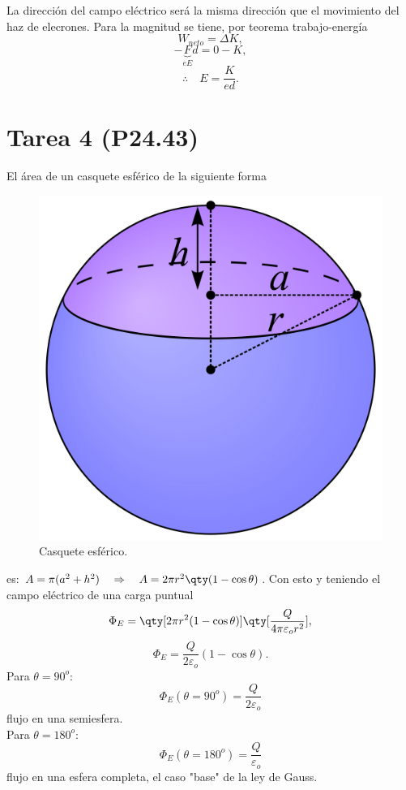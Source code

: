La dirección del campo eléctrico será la misma dirección que el movimiento del haz de elecrones. Para la magnitud se tiene, por teorema trabajo-energía
	$$ W_{neto} = \Delta K, $$
	$$ -\underbrace{F}_{eE} d = 0 - K, $$
	$$ \therefore \quad E = \frac{K}{ed}. $$











\section*{Tarea 4 (P24.43)}

El área de un casquete esférico de la siguiente forma
	\begin{figure}[H]
		\centering
		\includegraphics[scale=0.1]{./img/casquete.png}
		\caption{Casquete esférico.}
		\label{casq}
	\end{figure}
es: $ A = \pi (a^2 + h^2) \quad \Rightarrow \quad A = 2\pi r^2 \qty(1-\cos{\theta}) $. Con esto y teniendo el campo eléctrico de una carga puntual
	$$ \Phi _E = \qty[2\pi r^2 (1-\cos{\theta})]\qty[\frac{Q}{4\pi \varepsilon _o r^2}], $$
	$$ \Phi _E = \frac{Q}{2\varepsilon _o} (1 - \cos{\theta}). $$
Para $\theta = 90^o$:
	$$ \Phi _E (\theta = 90^o) = \frac{Q}{2\varepsilon _o} $$
flujo en una semiesfera. \\
Para $\theta = 180^o$:
	$$ \Phi _E (\theta = 180^o) = \frac{Q}{\varepsilon _o} $$
flujo en una esfera completa, el caso "base" de la ley de Gauss.











